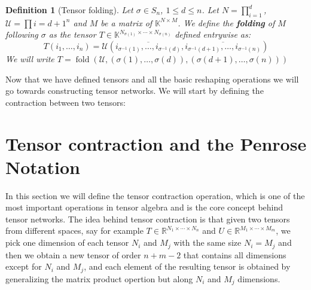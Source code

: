 \documentclass[11pt,a4paper,openright,oneside]{book}
\numberwithin{equation}{section}
\newtheorem{defn0}{Definition}[chapter]
\newenvironment{definition}{ \begin{defn0}}{\end{defn0}}
\DeclareMathOperator{\folding}{fold}
\begin{document}
\begin{definition}[Tensor folding]
    Let $\sigma \in S_n$, $1 \leqslant d \leqslant n$. Let $N = \prod_{i=1}^d$, $\mathcal{U} = \prod{i=d+1}^n$ and $M$ be a matrix of $\mathbb{K}^{N \times M}$.
    We define the \textbf{folding} of $M$ following $\sigma$ as the tensor $T \in \mathbb{K}^{N_{\sigma(1)} \times \cdots \times N_{\sigma(n)}}$ defined entrywise as:
    $$T(i_1, \dots, i_n) = \mathcal{U}(\overline{i_{\sigma^{-1}(1)}, \dots, i_{\sigma^{-1}(d)}}, \overline{i_{\sigma^{-1}(d+1)}, \dots, i_{\sigma^{-1}(n)}})$$
    We will write $T = \folding(\mathcal{U}, (\sigma(1), \dots, \sigma(d)), (\sigma(d+1), \dots, \sigma(n)))$
\end{definition}

Now that we have defined tensors and all the basic reshaping operations we will
go towards constructing tensor networks. We will start by defining the contraction between two tensors:

\section{Tensor contraction and the Penrose Notation}

In this section we will define the tensor contraction operation, which is one of the most important operations
in tensor algebra and is the core concept behind tensor networks.
The idea behind tensor contraction is that given two tensors from different spaces, say for example
$T \in \mathbb{R}^{N_1 \times \cdots \times N_n}$ and $U \in \mathbb{R}^{M_1 \times \cdots \times M_m}$, we pick one dimension of
each tensor $N_i$ and $M_j$ with the same size $N_i = M_j$ and then we obtain a new tensor of order $n + m - 2$ that contains all dimensions except for $N_i$ and $M_j$, and
each element of the resulting tensor is obtained by generalizing the matrix product opertion but along $N_i$ and $M_j$ dimensions.
\end{document}
